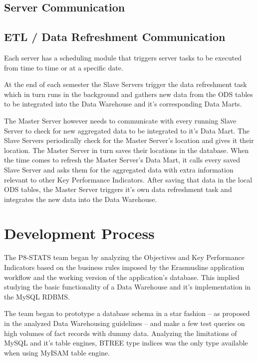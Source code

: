 \subsection{Server Communication}


\subsection{ETL / Data Refreshment Communication}
Each server has a scheduling module that triggers server tasks to be executed
from time to time or at a specific date.

At the end of each semester the Slave Servers trigger the data refreshment task
which in turn runs in the background and gathers new data from the ODS tables to
be integrated into the Data Warehouse and it's corresponding Data Marts.

The Master Server however needs to communicate with every running Slave Server
to check for new aggregated data to be integrated to it's Data Mart. The Slave
Servers periodically check for the Master Server's location and gives it their
location. The Master Server in turn saves their locations in the database. When
the time comes to refresh the Master Server's Data Mart, it calls every saved
Slave Server and asks them for the aggregated data with extra information
relevant to other Key Performance Indicators. After saving that data in the
local ODS tables, the Master Server triggers it's own data refreshment task and
integrates the new data into the Data Warehouse.


\section{Development Process}

The P8-STATS team began by analyzing the Objectives and Key Performance
Indicators based on the business rules imposed by the Erasmusline application
workflow and the working version of the application's database. This implied
studying the basic functionality of a Data Warehouse and it's implementation in
the MySQL RDBMS.

The team began to prototype a database schema in a star fashion – as proposed in
the analyzed Data Warehousing guidelines – and make a few test queries on high
volumes of fact records with dummy data. Analyzing the limitations of MySQL and
it's table engines, BTREE type indices was the only type available when using
MyISAM table engine.

